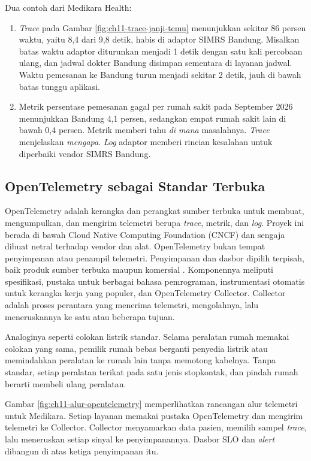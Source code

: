 Dua contoh dari Medikara Health:
\begin{enumerate}
  \item \textit{Trace} pada Gambar \ref{fig:ch11-trace-janji-temu} menunjukkan sekitar 86 persen
        waktu, yaitu 8,4 dari 9,8 detik, habis di adaptor SIMRS Bandung. Misalkan batas waktu
        adaptor diturunkan menjadi 1 detik dengan satu kali percobaan ulang, dan jadwal dokter
        Bandung disimpan sementara di layanan jadwal. Waktu pemesanan ke Bandung turun menjadi
        sekitar 2 detik, jauh di bawah batas tunggu aplikasi.
  \item Metrik persentase pemesanan gagal per rumah sakit pada September 2026 menunjukkan Bandung
        4,1 persen, sedangkan empat rumah sakit lain di bawah 0,4 persen. Metrik memberi tahu
        \textit{di mana} masalahnya. \textit{Trace} menjelaskan \textit{mengapa}. \textit{Log}
        adaptor memberi rincian kesalahan untuk diperbaiki vendor SIMRS Bandung.
\end{enumerate}

\subsection{OpenTelemetry sebagai Standar Terbuka}

OpenTelemetry adalah kerangka dan perangkat sumber terbuka untuk membuat, mengumpulkan, dan
mengirim telemetri berupa \textit{trace}, metrik, dan \textit{log}. Proyek ini berada di bawah
Cloud Native Computing Foundation (CNCF) dan sengaja dibuat netral terhadap vendor dan alat.
OpenTelemetry bukan tempat penyimpanan atau penampil telemetri. Penyimpanan dan dasbor dipilih
terpisah, baik produk sumber terbuka maupun komersial \cite{opentelemetry}. Komponennya meliputi
spesifikasi, pustaka untuk berbagai bahasa pemrograman, instrumentasi otomatis untuk kerangka kerja
yang populer, dan OpenTelemetry Collector. Collector adalah proses perantara yang menerima
telemetri, mengolahnya, lalu meneruskannya ke satu atau beberapa tujuan.

Analoginya seperti colokan listrik standar. Selama peralatan rumah memakai colokan yang sama,
pemilik rumah bebas berganti penyedia listrik atau memindahkan peralatan ke rumah lain tanpa
memotong kabelnya. Tanpa standar, setiap peralatan terikat pada satu jenis stopkontak, dan pindah
rumah berarti membeli ulang peralatan.

Gambar \ref{fig:ch11-alur-opentelemetry} memperlihatkan rancangan alur telemetri untuk Medikara.
Setiap layanan memakai pustaka OpenTelemetry dan mengirim telemetri ke Collector. Collector
menyamarkan data pasien, memilih sampel \textit{trace}, lalu meneruskan setiap sinyal ke
penyimpanannya. Dasbor SLO dan \textit{alert} dibangun di atas ketiga penyimpanan itu.

